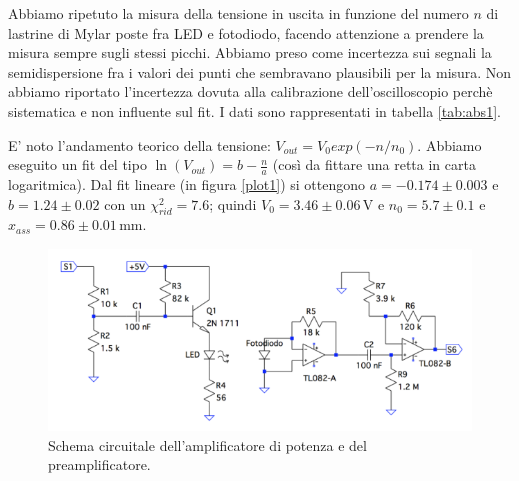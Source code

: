\documentclass[10pt,a4paper]{article}
\begin{document}
Abbiamo ripetuto la misura della tensione in uscita in funzione del numero $n$ di lastrine di Mylar poste fra LED e fotodiodo, facendo attenzione a prendere   la misura sempre sugli stessi picchi. 
Abbiamo preso come incertezza sui segnali la semidispersione fra i valori dei punti che sembravano plausibili per la misura.
Non abbiamo riportato l'incertezza dovuta alla  calibrazione dell'oscilloscopio perchè sistematica e non influente sul fit. I dati sono rappresentati in tabella \ref{tab:abs1}. 

E' noto l'andamento teorico della tensione: $V_{out}=V_0 exp(-n/n_0)$. Abbiamo eseguito un fit del tipo $\ln(V_{out})=b-\frac{n}{a}$ (così da fittare una retta in carta logaritmica). %
Dal fit lineare (in figura \ref{plot1}) si ottengono $a=-0.174\pm0.003$ e $b=1.24\pm0.02$ con un $\chi^2_{rid}=7.6$; quindi $V_0= 3.46\pm0.06\,\mbox{V}$ e $n_0=5.7\pm0.1$ e $x_{ass}=0.86\pm0.01\,\mbox{mm}$.


\begin{figure}[!htb]
  \centering
  \includegraphics[scale=0.75]{ampli-preampli.png}
\caption{Schema circuitale dell'amplificatore di potenza e del preamplificatore.\label{fig:ampli-preampli}}
\end{figure}
\end{document}
